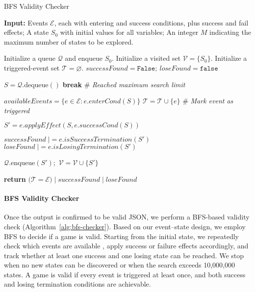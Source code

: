 \begin{algorithm}[!ht]
   \caption{BFS Validity Checker}
   \label{alg:bfs-checker}
\begin{algorithmic}
   \STATE \textbf{Input:} Events \(\mathcal{E}\), each with entering and success conditions, plus success and fail effects; A state \(S_0\) with initial values for all variables; An integer \(M\) indicating the maximum number of states to be explored.

   \STATE Initialize a queue \(\mathcal{Q}\) and enqueue \(S_0\).
   \STATE Initialize a visited set \(\mathcal{V} = \{S_0\}\).
   \STATE Initialize a triggered-event set \(\mathcal{T} = \varnothing\).
   \STATE \(\textit{successFound} = \texttt{False};~ \textit{loseFound} = \texttt{false}\)

   \REPEAT
      \STATE \(S = \mathcal{Q}.\text{dequeue}()\)
         \STATE \textbf{break} \quad\# \textit{Reached maximum search limit}
      \ENDIF
      
      \STATE \(\textit{availableEvents} = \{ e \in \mathcal{E} : e.\mathit{enterCond}(S) \}\)
         \STATE \(\mathcal{T} = \mathcal{T} \cup \{e\}\) \quad\# \textit{Mark event as triggered}

         \STATE \(S' = \textit{e.applyEffect}(S,\mathit{e.successCond}(S))\)
         
        \STATE \(\textit{successFound} \;|= \textit{e.isSuccessTermination}(S')\)
        \STATE \(\textit{loseFound} \;|= \textit{e.isLosingTermination}(S')\)

            \STATE \(\mathcal{Q}.\text{enqueue}(S')\);~\(\mathcal{V} = \mathcal{V} \cup \{S'\}\)
         \ENDIF
      \ENDFOR

   \STATE \textbf{return} 
      \(\bigl(\mathcal{T} = \mathcal{E}\bigr) \;|\; \textit{successFound} \;|\; \textit{loseFound}\)
   \ENDFUNCTION
\end{algorithmic}
\end{algorithm}

\paragraph{BFS Validity Checker}  
Once the output is confirmed to be valid JSON, we perform a BFS-based validity check (Algorithm~\ref{alg:bfs-checker}). Based on our event--state design, we employ BFS to decide if a game is valid. Starting from the initial state, we repeatedly check which events are available , apply success or failure effects accordingly, and track whether at least one success and one losing state can be reached. We stop when no new states can be discovered or when the search exceeds 10{,}000{,}000 states. A game is valid if every event is triggered at least once, and both success and losing termination conditions are achievable.

